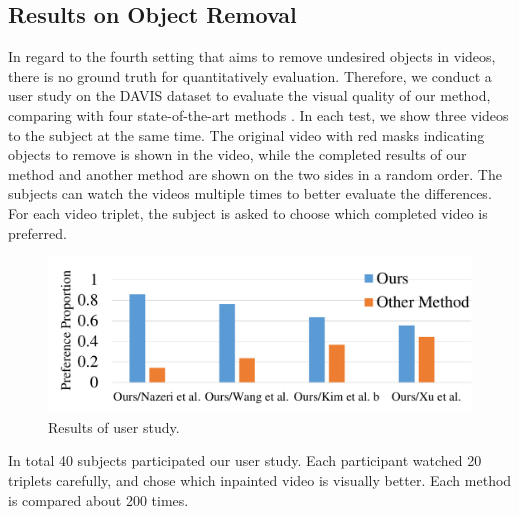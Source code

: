 \subsection{Results on Object Removal}


In regard to the fourth setting that aims to remove undesired objects in videos, there is no ground truth for quantitatively evaluation. Therefore,
we conduct a user study on the DAVIS dataset to evaluate the visual quality of our method, comparing with four state-of-the-art methods \cite{nazeri2019edgeconnect,wang2019video,Kim_2019_CVPR1,Xu_2019_CVPR}.
%
In each test, we show three videos to the subject at the same time. The original video with red masks indicating objects to remove is shown in the video, while the completed results of our method and another method are shown on the two sides in a random order.
%  
The subjects can watch the videos multiple times to better evaluate the differences.
For each video triplet, the subject is asked to choose which completed video is preferred.
%
\begin{figure}[!t]
	\centering
	\includegraphics[width=1.0\columnwidth]{userstudy} %
	\caption{Results of user study.}
	\label{userstudy}
\end{figure}
In total 40 subjects participated our user study. 
Each participant watched 20 triplets carefully, and chose which inpainted video is visually better. 
%
Each method is compared about 200 times.
%
